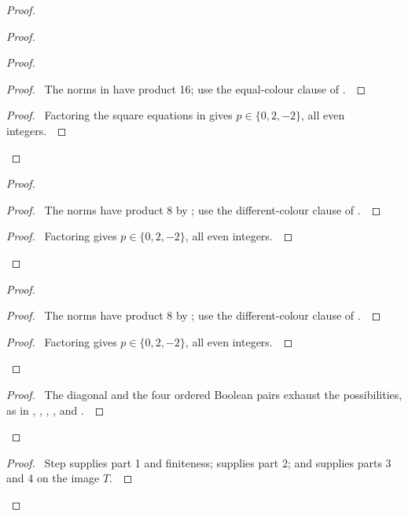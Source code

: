 \documentclass[11pt]{amsart}
\let\qed\relax
\begin{document}
\begin{proof}
\begin{proof}
 \begin{proof}
  \begin{proof}\pf\ The norms in  have product
  16; use the equal-colour clause of .~\qed\end{proof}
  \qedstep
  \begin{proof}\pf\ Factoring the square equations in
   gives $p\in\{0,2,-2\}$, all even integers.~\qed\end{proof}
 \end{proof}
 \begin{proof}
  \begin{proof}\pf\ The norms have product 8 by ;
  use the different-colour clause of .~\qed\end{proof}
  \qedstep
  \begin{proof}\pf\ Factoring  gives
  $p\in\{0,2,-2\}$, all even integers.~\qed\end{proof}
 \end{proof}
 \begin{proof}
  \begin{proof}\pf\ The norms have product 8 by ;
  use the different-colour clause of .~\qed\end{proof}
  \qedstep
  \begin{proof}\pf\ Factoring  gives
  $p\in\{0,2,-2\}$, all even integers.~\qed\end{proof}
 \end{proof}
 \qedstep
 \begin{proof}\pf\ The diagonal and the four ordered Boolean pairs
 exhaust the possibilities, as in ,
 , , ,
 and .~\qed\end{proof}
\end{proof}
\qedstep
\begin{proof}\pf\ Step  supplies part 1 and
finiteness;  supplies part 2; and
 supplies parts 3 and 4 on the image $T$.~\qed\end{proof}
\end{proof}
\end{document}
